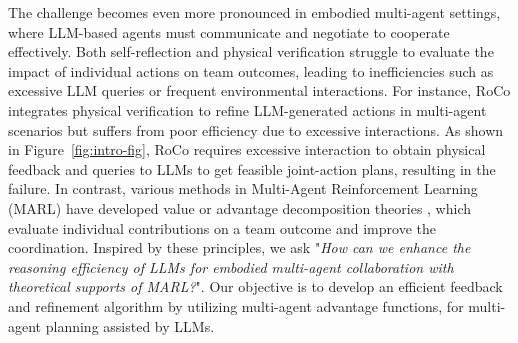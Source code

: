 \documentclass[11pt]{article}
\theoremstyle{plain}
\theoremstyle{remark}
\begin{document}
The challenge becomes even more pronounced in embodied multi-agent settings, where LLM-based agents must communicate and negotiate to cooperate effectively.
Both self-reflection and physical verification struggle to evaluate the impact of individual actions on team outcomes, leading to inefficiencies such as excessive LLM queries or frequent environmental interactions.
For instance, RoCo \citep{mandi2023roco} integrates physical verification to refine LLM-generated actions in multi-agent scenarios but suffers from poor efficiency due to excessive interactions. As shown in Figure~\ref{fig:intro-fig}, RoCo requires excessive interaction to obtain physical feedback and queries to LLMs to get feasible joint-action plans, resulting in the failure.
In contrast, various methods in Multi-Agent Reinforcement Learning (MARL) \citep{MAsurvey} have developed value or advantage decomposition theories \citep{QMIX,kuba2022happo, Mirror}, which evaluate individual contributions on a team outcome and improve the coordination.
Inspired by these principles, we ask "\emph{How can we enhance the reasoning efficiency of LLMs for embodied multi-agent collaboration with theoretical supports of MARL?}".
Our objective is to develop an efficient feedback and refinement algorithm by utilizing multi-agent advantage functions, for multi-agent planning assisted by LLMs.
\end{document}
